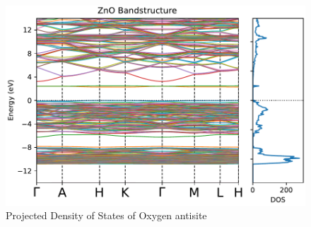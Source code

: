 \begin{figure}[tbh!]
	\centering
	\includegraphics[width=0.7\linewidth]{"images/band-dos_O-antisite"}
	\caption[Combined Density of states of Oxygen antisite]{Projected Density of States of Oxygen antisite}
\end{figure}